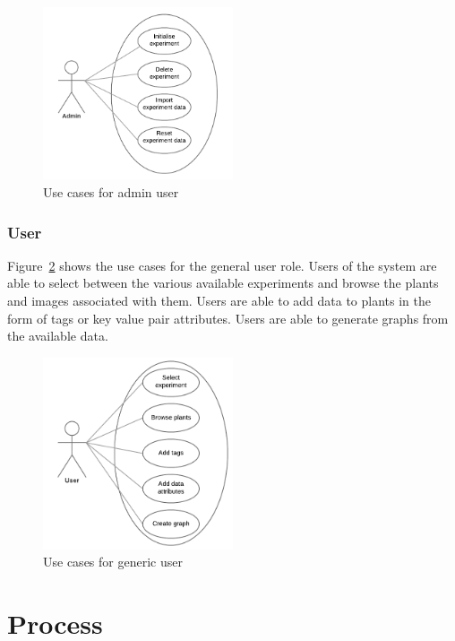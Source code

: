 \begin{figure}[H]
    \centering
    \includegraphics[width=0.5\textwidth]{images/analysis/admin_case}
    \caption{Use cases for admin user}
    \label{fig:admin_case}
\end{figure}

\subsubsection{User}

Figure~\ref{fig:user_case} shows the use cases for the general user role. Users of the system are able to select between the various available experiments and browse the plants and images associated with them. Users are able to add data to plants in the form of tags or key value pair attributes. Users are able to generate graphs from the available data.

\begin{figure}[H]
    \centering
    \includegraphics[width=0.5\textwidth]{images/analysis/user_case}
    \caption{Use cases for generic user}
    \label{fig:user_case}
\end{figure}

\section{Process}

